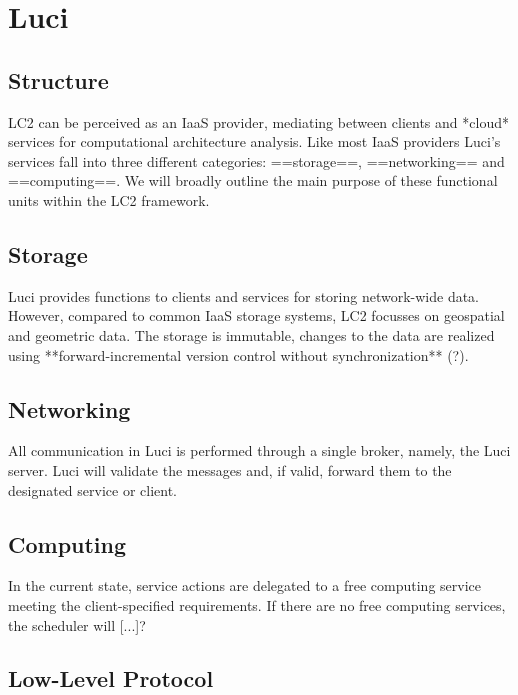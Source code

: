 \section{Luci}
\label{ch:luci}

\subsection{Structure}
\label{sec:luci:structure}
LC2 can be perceived as an IaaS provider, mediating between clients and *cloud* services for computational architecture analysis. Like most IaaS providers Luci's services fall into three different categories: ==storage==, ==networking== and ==computing==. We will broadly outline the main purpose of these functional units within the LC2 framework.

\subsection{Storage}
\label{sec:luci:structure:storage}
Luci provides functions to clients and services for storing network-wide data. However, compared to common IaaS storage systems, LC2 focusses on geospatial and geometric data. The storage is immutable, changes to the data are realized using **forward-incremental version control without synchronization** (?).

\subsection{Networking}
\label{sec:luci:structure:networking}
All communication in Luci is performed through a single broker, namely, the Luci server. Luci will validate the messages and, if valid, forward them to the designated service or client.

\subsection{Computing}
\label{sec:luci:structure:computing}
In the current state, service actions are delegated to a free computing service meeting the client-specified requirements. If there are no free computing services, the scheduler will [...]?

\subsection{Low-Level Protocol}

